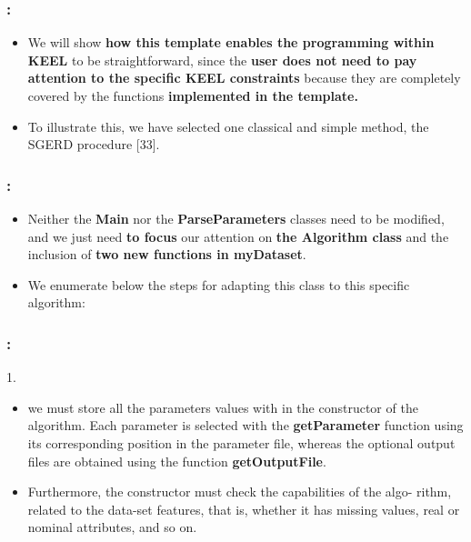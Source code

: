 \documentclass{beamer}
\begin{document}
\begin{CJK*}{UTF8}{bsmi}

\begin{frame}
	\frametitle{\insertsection : \insertsubsection}
	
	
	\begin{itemize}
		\item We will show \textbf{how this template enables the programming within KEEL} to be straightforward, since the \textbf{user does not need to pay attention to the specific KEEL constraints} because they are completely covered by the functions\textbf{ implemented in the template.}
		\item To illustrate this, we have selected one classical and simple method, the SGERD procedure [33].
	\end{itemize}
	
\end{frame}


\begin{frame}
	\frametitle{\insertsection : \insertsubsection}
	
	
	\begin{itemize}
		\item Neither the \textbf{Main} nor the \textbf{ParseParameters }classes need to be modified, and we just need\textbf{ to focus }our attention on\textbf{ the Algorithm class }and the inclusion of \textbf{two new functions in myDataset}. 
		\item We enumerate below the steps for adapting this class to this specific algorithm:
	\end{itemize}
	
\end{frame}


\begin{frame}
	\frametitle{\insertsection : \insertsubsection}
	
		\begin{block}{1.}
	\begin{itemize}
		\item we must store all the parameters values with in the constructor of the algorithm. Each parameter is selected with the \textbf{getParameter} function using its corresponding position in the parameter file, whereas the optional output files are obtained using the function \textbf{getOutputFile}. 
		\item Furthermore, the constructor must check the capabilities of the algo- rithm, related to the data-set features, that is, whether it has missing values, real or nominal attributes, and so on.
	\end{itemize}
\end{block}
	

\end{frame}
\end{CJK*}
\end{document}
